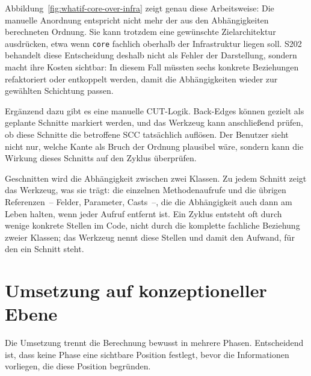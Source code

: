 \documentclass[a4paper,11pt]{article}
\begin{document}
Abbildung~\ref{fig:whatif-core-over-infra} zeigt genau diese Arbeitsweise:
Die manuelle Anordnung entspricht nicht mehr der aus den Abh\"angigkeiten
berechneten Ordnung. Sie kann trotzdem eine gew\"unschte Zielarchitektur
ausdr\"ucken, etwa wenn \texttt{core} fachlich oberhalb der Infrastruktur
liegen soll. S202 behandelt diese Entscheidung deshalb nicht als Fehler der
Darstellung, sondern macht ihre Kosten sichtbar: In diesem Fall m\"ussten sechs
konkrete Beziehungen refaktoriert oder entkoppelt werden, damit die
Abh\"angigkeiten wieder zur gew\"ahlten Schichtung passen.

Erg\"anzend dazu gibt es eine manuelle CUT-Logik. Back-Edges k\"onnen gezielt
als geplante Schnitte markiert werden, und das Werkzeug kann anschlie\ss{}end
pr\"ufen, ob diese Schnitte die betroffene SCC tats\"achlich aufl\"osen. Der
Benutzer sieht nicht nur, welche Kante als Bruch der Ordnung plausibel w\"are,
sondern kann die Wirkung dieses Schnitts auf den Zyklus \"uberpr\"ufen.

Geschnitten wird die Abh\"angigkeit zwischen zwei Klassen. Zu jedem Schnitt zeigt
das Werkzeug, was sie tr\"agt: die einzelnen Methodenaufrufe und die \"ubrigen
Referenzen~-- Felder, Parameter, Casts~--, die die Abh\"angigkeit auch dann am
Leben halten, wenn jeder Aufruf entfernt ist. Ein Zyklus entsteht oft durch
wenige konkrete Stellen im Code, nicht durch die komplette fachliche Beziehung
zweier Klassen; das Werkzeug nennt diese Stellen und damit den Aufwand, f\"ur den
ein Schnitt steht.

\section{Umsetzung auf konzeptioneller Ebene}

Die Umsetzung trennt die Berechnung bewusst in mehrere Phasen. Entscheidend
ist, dass keine Phase eine sichtbare Position festlegt, bevor die Informationen
vorliegen, die diese Position begr\"unden.
\end{document}
